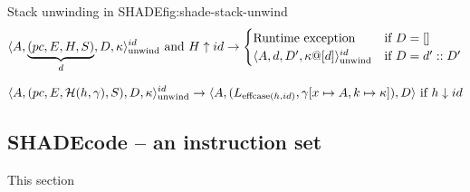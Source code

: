 \documentclass[class=article, crop=false]{standalone}
\begin{document}
\begin{myfigure}[1]{Stack unwinding in SHADE}{fig:shade-stack-unwind}
    $$ \langle A, \underbrace{(pc, E, H, S)}_d, D, \kappa  \rangle_\text{unwind}^{id} \text{ and } H \uparrow id \to \begin{cases}
        \text{Runtime exception} & \text{if } D = [] \\
    \langle A, d, D', \kappa @ [d] \rangle_\text{unwind}^{id} & \text{if } D = d' :: D' \end{cases} $$

    $$ \langle A, (pc, E, \mathcal{H}(h, \gamma), S), D, \kappa \rangle_\text{unwind}^{id} \to
        \langle A, (L_{\text{effcase}(h, id)}, \gamma[x \mapsto A, k \mapsto \kappa] ), D \rangle \text{ if } h \downarrow id $$
\end{myfigure}


\subsection{SHADEcode -- an instruction set}

This section
\end{document}
